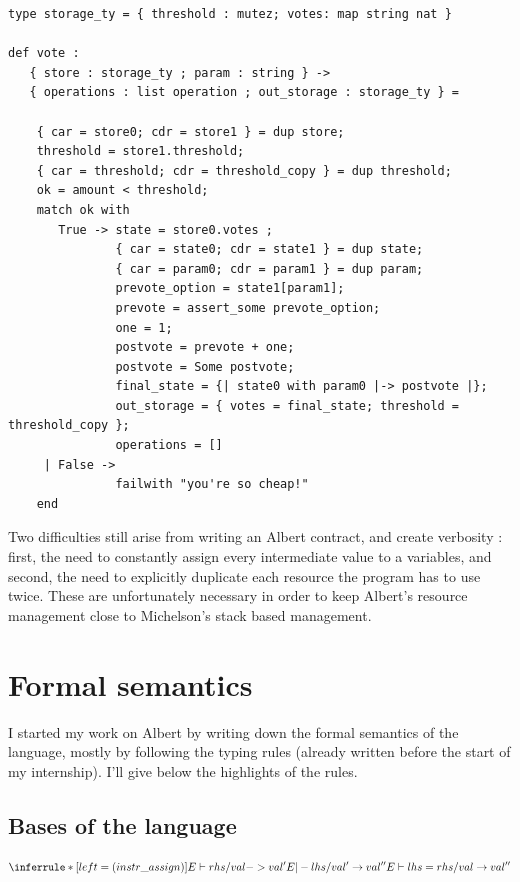 \documentclass{report}
\begin{document}
\lstset{language=albert}
\begin{lstlisting}
type storage_ty = { threshold : mutez; votes: map string nat }

def vote :
   { store : storage_ty ; param : string } ->
   { operations : list operation ; out_storage : storage_ty } =

    { car = store0; cdr = store1 } = dup store;
    threshold = store1.threshold;
    { car = threshold; cdr = threshold_copy } = dup threshold;
    ok = amount < threshold;
    match ok with
       True -> state = store0.votes ;
               { car = state0; cdr = state1 } = dup state;
               { car = param0; cdr = param1 } = dup param;
               prevote_option = state1[param1];
               prevote = assert_some prevote_option;
               one = 1;
               postvote = prevote + one;
               postvote = Some postvote;
               final_state = {| state0 with param0 |-> postvote |};
               out_storage = { votes = final_state; threshold = threshold_copy };
               operations = []
     | False ->
               failwith "you're so cheap!"
    end
\end{lstlisting}

Two difficulties still arise from writing an Albert contract, and create verbosity : first, the need to constantly assign every intermediate value to a variables, and second, the need to explicitly duplicate each resource the program has to use twice. These are unfortunately necessary in order to keep Albert's resource management close to Michelson's stack based management.

\section{Formal semantics}
\label{albertSemantics}

I started my work on Albert by writing down the formal semantics of the language, mostly by following the typing rules (already written before the start of my internship). I'll give below the highlights of the rules.

\subsection{Bases of the language}

$$
\inferrule* [left=(instr\_assign)]
    { E \vdash rhs / val -> val' \\ E |- lhs / val' \rightarrow val'' }
    { E \vdash lhs = rhs / val \rightarrow val'' }
$$
\end{document}
